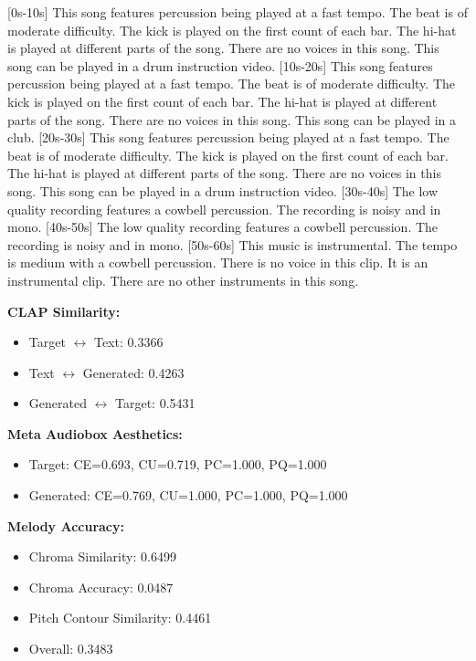 \documentclass{article}
\begin{document}
\small
[0s-10s] This song features percussion being played at a fast tempo. The beat is of moderate difficulty. The kick is played on the first count of each bar. The hi-hat is played at different parts of the song. There are no voices in this song. This song can be played in a drum instruction video. [10s-20s] This song features percussion being played at a fast tempo. The beat is of moderate difficulty. The kick is played on the first count of each bar. The hi-hat is played at different parts of the song. There are no voices in this song. This song can be played in a club. [20s-30s] This song features percussion being played at a fast tempo. The beat is of moderate difficulty. The kick is played on the first count of each bar. The hi-hat is played at different parts of the song. There are no voices in this song. This song can be played in a drum instruction video. [30s-40s] The low quality recording features a cowbell percussion. The recording is noisy and in mono. [40s-50s] The low quality recording features a cowbell percussion. The recording is noisy and in mono. [50s-60s] This music is instrumental. The tempo is medium with a cowbell percussion. There is no voice in this clip. It is an instrumental clip. There are no other instruments in this song.
\normalsize

\textbf{CLAP Similarity:}
\begin{itemize}
    \item Target $\leftrightarrow$ Text: 0.3366
    \item Text $\leftrightarrow$ Generated: 0.4263
    \item Generated $\leftrightarrow$ Target: 0.5431
\end{itemize}

\textbf{Meta Audiobox Aesthetics:}
\begin{itemize}
    \item Target: CE=0.693, CU=0.719, PC=1.000, PQ=1.000
    \item Generated: CE=0.769, CU=1.000, PC=1.000, PQ=1.000
\end{itemize}

\textbf{Melody Accuracy:}
\begin{itemize}
    \item Chroma Similarity: 0.6499
    \item Chroma Accuracy: 0.0487
    \item Pitch Contour Similarity: 0.4461
    \item Overall: 0.3483
\end{itemize}
\end{document}
